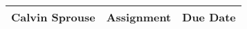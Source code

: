 \documentclass[a4paper, 12pt]{.config/homework}
\begin{document}
\noindent
\begin{tabularx}{\textwidth}{>{\centering\arraybackslash}X>{\centering\arraybackslash}X>{\centering\arraybackslash}X}
Calvin Sprouse & Assignment & Due Date\\\hline
\end{tabularx}

\end{document}
